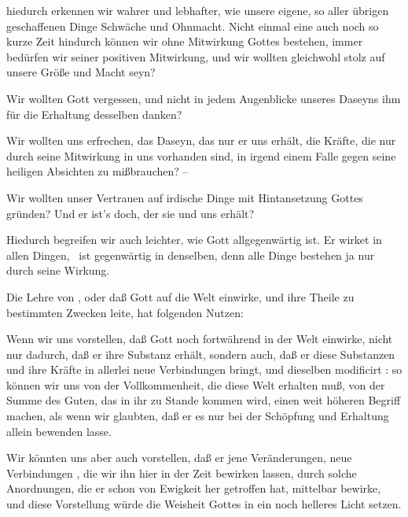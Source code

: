 \begin{aufza}
\begin{aufzb}
\item hiedurch erkennen wir wahrer und lebhafter, wie unsere eigene, so aller übrigen geschaffenen Dinge Schwäche und Ohnmacht. Nicht einmal eine auch noch so kurze Zeit hindurch können wir ohne Mitwirkung Gottes bestehen, immer bedürfen wir seiner positiven Mitwirkung, und wir wollten gleichwohl stolz auf unsere Größe und Macht seyn?
\item Wir wollten Gott vergessen, und nicht in jedem Augenblicke unseres Daseyns ihm für die Erhaltung desselben danken?
\item Wir wollten uns erfrechen, das Daseyn, das nur er uns erhält, die Kräfte, die nur durch seine Mitwirkung in uns vorhanden sind, in irgend einem Falle gegen seine heiligen Absichten zu mißbrauchen? --~
\item Wir wollten unser Vertrauen auf irdische Dinge mit Hintansetzung Gottes gründen? Und er ist's doch, der sie und uns erhält?
\item Hiedurch begreifen wir auch leichter, wie Gott allgegenwärtig ist. Er wirket in allen Dingen, \dh\ ist gegenwärtig in denselben, denn alle Dinge bestehen ja nur durch seine Wirkung.
\end{aufzb}
\item Die Lehre von , oder daß Gott  auf die Welt einwirke, und ihre Theile zu bestimmten Zwecken leite, hat folgenden Nutzen:
\begin{aufzb}
\item Wenn wir uns vorstellen, daß Gott noch fortwährend in der Welt einwirke, nicht nur dadurch, daß er ihre Substanz erhält, sondern auch, daß er diese Substanzen und ihre Kräfte in allerlei neue Verbindungen bringt, und dieselben modificirt \udgl : so können wir uns von der Vollkommenheit, die diese Welt erhalten muß, von der Summe des Guten, das in ihr zu Stande kommen wird, einen weit höheren Begriff machen, als wenn wir glaubten, daß er es nur bei der Schöpfung und Erhaltung allein bewenden lasse.\par
{} Wir könnten uns aber auch vorstellen, daß er jene Veränderungen, neue Verbindungen \usw , die wir ihn hier in der Zeit bewirken lassen, durch solche Anordnungen, die er schon von Ewigkeit her getroffen hat, mittelbar bewirke, und diese Vorstellung würde die Weisheit Gottes in ein noch helleres Licht setzen.\par

\end{aufzb}
\end{aufza}
